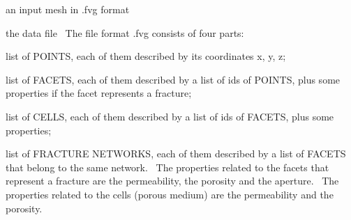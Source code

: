 \begin{DoxyItemize}
\item an input mesh in \textquotesingle{}.fvg\textquotesingle{} format~\newline

\item the data file~\newline
 The file format \textquotesingle{}.fvg\textquotesingle{} consists of four parts\+:~\newline

\item list of P\+O\+I\+N\+TS, each of them described by its coordinates x, y, z;~\newline

\item list of F\+A\+C\+E\+TS, each of them described by a list of ids of P\+O\+I\+N\+TS, plus some properties if the facet represents a fracture;~\newline

\item list of C\+E\+L\+LS, each of them described by a list of ids of F\+A\+C\+E\+TS, plus some properties;~\newline

\item list of F\+R\+A\+C\+T\+U\+RE N\+E\+T\+W\+O\+R\+KS, each of them described by a list of F\+A\+C\+E\+TS that belong to the same network.~\newline
 The properties related to the facets that represent a fracture are the permeability, the porosity and the aperture.~\newline
 The properties related to the cells (porous medium) are the permeability and the porosity.
\end{DoxyItemize}


